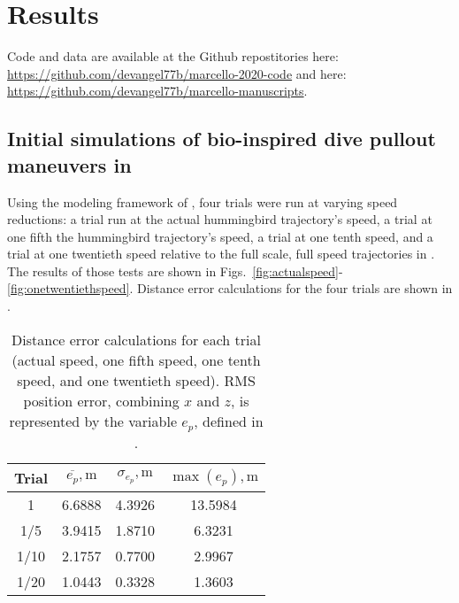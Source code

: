 \section{Results}
\label{sec:results}

Code and data are available at the Github repostitories here: \url{https://github.com/devangel77b/marcello-2020-code} and here: \url{https://github.com/devangel77b/marcello-manuscripts}. 

\subsection{Initial simulations of bio-inspired dive pullout maneuvers in \Matlab}
Using the modeling framework of \cite{hartman2014quadcopter}, four trials were run at varying speed reductions: a trial run at the actual hummingbird trajectory's speed, a trial at one fifth the hummingbird trajectory's speed, a trial at one tenth speed, and a trial at one twentieth speed relative to the full scale, full speed trajectories in \cite{clark2009courtship}. The results of those tests are shown in Figs.~\ref{fig:actualspeed}-\ref{fig:onetwentiethspeed}. Distance error calculations for the four trials are shown in . 
\begin{table}[hb]
\caption{Distance error calculations for each trial (actual speed, one fifth speed, one tenth speed, and one twentieth speed). RMS position error, combining $x$ and $z$, is represented by the variable $e_p$, defined in .}
\label{tab:RMSE}
\begin{center}
\begin{tabular}{cccc}
\toprule
Trial & $\overline{e_p}, \si{\meter}$ & $\sigma_{e_p}, \si{\meter}$ & $\max(e_p), \si{\meter}$  \\ %
\midrule
1 & 6.6888 & 4.3926 & 13.5984 \\
1/5 & 3.9415 & 1.8710 & 6.3231 \\
1/10 & 2.1757 & 0.7700 & 2.9967 \\
1/20 & 1.0443 & 0.3328 & 1.3603 \\
\bottomrule
\end{tabular}
\end{center}
\end{table}

